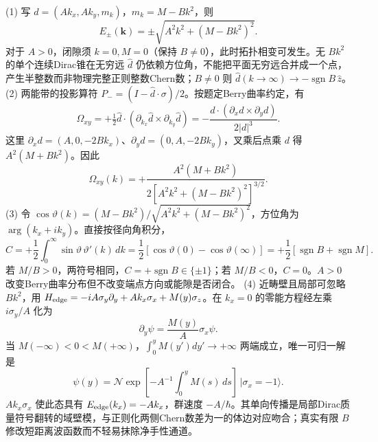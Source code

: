 (1) 写 \(d=(Ak_x,Ak_y,m_k)\)，\(m_k=M-Bk^2\)，则
\[
E_\pm(\boldsymbol k)=\pm\sqrt{A^2k^2+(M-Bk^2)^2}.
\]
对于 \(A>0\)，闭隙须 \(k=0,M=0\)（保持 \(B\ne0\)），此时拓扑相变可发生。无 \(Bk^2\) 的单个连续Dirac锥在无穷远 \(\hat d\) 仍依赖方位角，不能把平面无穷远合并成一个点，产生半整数而非物理完整正则整数Chern数；\(B\ne0\) 则 \(\hat d(k\to\infty)\to-\operatorname{sgn}B\,\hat z\)。
(2) 两能带的投影算符 \(P_-=(I-\hat d\cdot\sigma)/2\)。按题定Berry曲率约定，有
\[
\Omega_{xy}=+\tfrac12\hat d\cdot(\partial_{k_x}\hat d\times\partial_{k_y}\hat d)
=-\frac{d\cdot(\partial_xd\times\partial_yd)}{2|d|^3}.
\]
这里 \(\partial_x d=(A,0,-2Bk_x)\)、\(\partial_y d=(0,A,-2Bk_y)\)，叉乘后点乘 \(d\) 得 \(A^2(M+Bk^2)\)。因此
\[
\Omega_{xy}(k)=+\frac{A^2(M+Bk^2)}{2[A^2k^2+(M-Bk^2)^2]^{3/2}}.
\]
(3) 令 \(\cos\vartheta(k)=(M-Bk^2)/\sqrt{A^2k^2+(M-Bk^2)^2}\)，方位角为 \(\arg(k_x+ik_y)\)。直接按径向角积分，
\[
C=+\frac12\int_0^\infty\sin\vartheta\,\vartheta'(k)\,dk
=\frac12[\cos\vartheta(0)-\cos\vartheta(\infty)]
=+\frac12[\operatorname{sgn}B+\operatorname{sgn}M].
\]
若 \(M/B>0\)，两符号相同，\(C=+\operatorname{sgn}B\in\{\pm1\}\)；若 \(M/B<0\)，\(C=0\)。\(A>0\) 改变Berry曲率分布但不改变端点方向或能隙是否闭合。
(4) 近畴壁且局部可忽略 \(Bk^2\)，用 \(H_{\rm edge}=-iA\sigma_y\partial_y+A k_x\sigma_x+M(y)\sigma_z\)。在 \(k_x=0\) 的零能方程经左乘 \(i\sigma_y/A\) 化为
\[
\partial_y\psi=\frac{M(y)}A\sigma_x\psi.
\]
当 \(M(-\infty)<0<M(+\infty)\)，\(\int_0^y M(y')dy'\to+\infty\) 两端成立，唯一可归一解是
\[
\psi(y)=\mathcal N\exp[-A^{-1}\!\int_0^yM(s)\,ds]\,|\sigma_x=-1\rangle.
\]
\(A k_x\sigma_x\) 使此态具有 \(E_{\rm edge}(k_x)=-Ak_x\)，群速度 \(-A/\hbar\)。其单向传播是局部Dirac质量符号翻转的域壁模，与正则化两侧Chern数差为一的体边对应吻合；真实有限 \(B\) 修改短距离波函数而不轻易抹除净手性通道。
